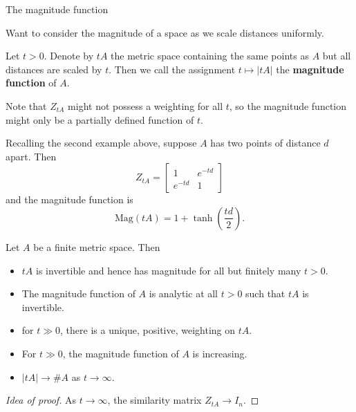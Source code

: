\documentclass[12pt,mathserif]{beamer}
\begin{document}
\begin{frame}[allowframebreaks]{The magnitude function}

Want to consider the magnitude of a space as we scale distances uniformly.

\begin{definition}
Let $t > 0$. Denote by $tA$ the metric space containing the same points as $A$ but all distances are scaled by $t$. Then we call the assignment $t\mapsto\vert tA\vert$ the \textbf{magnitude function} of $A$.
\end{definition}

Note that $Z_{tA}$ might not possess a weighting for all $t$, so the magnitude function might only be a partially defined function of $t$.

\framebreak

\begin{example}
Recalling the second example above, suppose $A$ has two points of distance $d$ apart. Then
\begin{equation*}
Z_{tA} = \begin{bmatrix} 1 & e^{-td} \\ e^{-td} & 1 \end{bmatrix}
\end{equation*}
and the magnitude function is
\begin{equation*}
\text{Mag}(tA) = 1 + \tanh\left(\frac{td}{2}\right).
\end{equation*}
\end{example}

\begin{theorem}
Let $A$ be a finite metric space. Then
\begin{itemize}
\item $tA$ is invertible and hence has magnitude for all but finitely many $t > 0$.
\item The magnitude function of $A$ is analytic at all $t>0$ such that $tA$ is invertible.
\item for $t \gg 0$, there is a unique, positive, weighting on $tA$.
\item For $t \gg 0$, the magnitude function of $A$ is increasing.
\item $\vert tA \vert \to \#A$ as $t \to \infty$.
\end{itemize}
\end{theorem}

\begin{proof}[Idea of proof]\renewcommand{\qedsymbol}{}
As $t\to\infty$, the similarity matrix $Z_{tA} \to I_n$.
\end{proof}


\end{frame}
\end{document}
